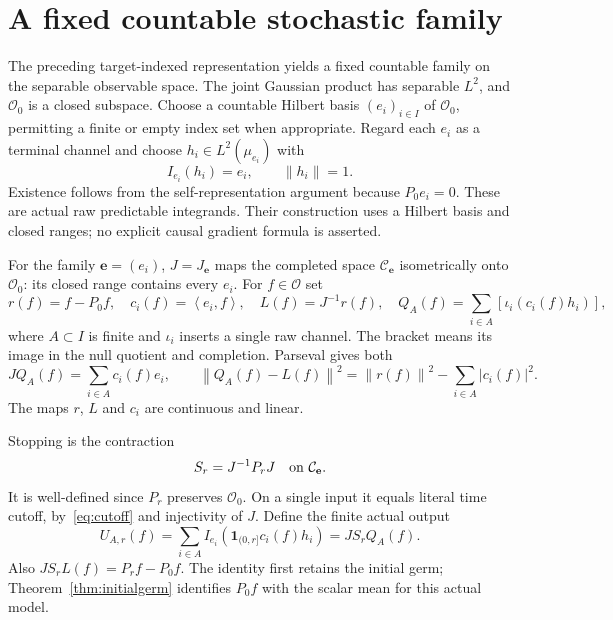 \documentclass[11pt]{article}
\theoremstyle{remark}\newtheorem{remark}[theorem]{Remark}
\newcommand{\one}{\mathbf1}
\newcommand{\norm}[1]{\left\lVert#1\right\rVert}
\newcommand{\inner}[2]{\left\langle#1,#2\right\rangle}
\newcommand{\OO}{\mathcal O}
\begin{document}
\section{A fixed countable stochastic family}
The preceding target-indexed representation yields a fixed countable
family on the separable observable space. The joint Gaussian product
has separable $L^2$, and $\OO_0$ is a closed subspace. Choose a
countable Hilbert basis $(e_i)_{i\in I}$ of $\OO_0$, permitting a
finite or empty index set when appropriate. Regard each $e_i$ as a
terminal channel and choose $h_i\in L^2(\mu_{e_i})$ with
\begin{equation}\label{eq:basis}
 I_{e_i}(h_i)=e_i,\qquad \norm{h_i}=1.
\end{equation}
Existence follows from the self-representation argument because
$P_0e_i=0$. These are actual raw predictable integrands. Their
construction uses a Hilbert basis and closed ranges; no explicit causal
gradient formula is asserted.

For the family $\mathbf e=(e_i)$, $J=J_{\mathbf e}$ maps the completed
space $\mathcal C_{\mathbf e}$ isometrically onto $\OO_0$: its closed
range contains every $e_i$. For $f\in\OO$ set
\[
 r(f)=f-P_0f,\quad c_i(f)=\inner{e_i}{f},\quad
 L(f)=J^{-1}r(f),\quad
 Q_A(f)=\sum_{i\in A}[\iota_i(c_i(f)h_i)],
\]
where $A\subset I$ is finite and $\iota_i$ inserts a single raw
channel. The bracket means its image in the null quotient and
completion. Parseval gives both
\begin{equation}\label{eq:parseval}
 JQ_A(f)=\sum_{i\in A}c_i(f)e_i,\qquad
 \norm{Q_A(f)-L(f)}^2
 =\norm{r(f)}^2-\sum_{i\in A}|c_i(f)|^2.
\end{equation}
The maps $r$, $L$ and $c_i$ are continuous and linear.

Stopping is the contraction
\[
 S_r=J^{-1}P_rJ\quad\hbox{on }\mathcal C_{\mathbf e}.
\]
It is well-defined since $P_r$ preserves $\OO_0$. On a single input it
equals literal time cutoff, by~\eqref{eq:cutoff} and injectivity of
$J$. Define the finite actual output
\begin{equation}\label{eq:actualfinite}
 U_{A,r}(f)=\sum_{i\in A}I_{e_i}
     (\one_{(0,r]}c_i(f)h_i)=JS_rQ_A(f).
\end{equation}
Also $JS_rL(f)=P_rf-P_0f$. The identity first retains the initial
germ; Theorem~\ref{thm:initialgerm} identifies $P_0f$ with the
scalar mean for this actual model.
\end{document}
